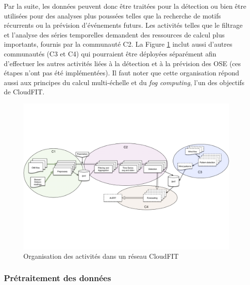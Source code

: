 Par la suite, les données peuvent donc être traitées pour la détection ou bien être utilisées pour des analyses plus poussées telles que la recherche de motifs récurrents ou la prévision d'événements futurs. Les activités telles que le filtrage et l'analyse des séries temporelles demandent des ressources de calcul plus importants, fournis par la communauté C2.
La Figure \ref{fig:blocs} inclut aussi d'autres communautés (C3 et C4) qui pourraient être déployées séparément afin d'effectuer les autres activités liées à la détection et à la prévision des OSE (ces étapes n'ont pas été implémentées). Il faut noter que cette organisation répond aussi aux principes du calcul multi-échelle et du \textit{fog computing}, l'un des objectifs de CloudFIT.

\begin{figure}
	\centering
	\includegraphics[width=1\linewidth]{img/4-process}
	\caption{Organisation des activités dans un réseau CloudFIT}\label{fig:blocs}
\end{figure}

\subsubsection{Prétraitement des données}


